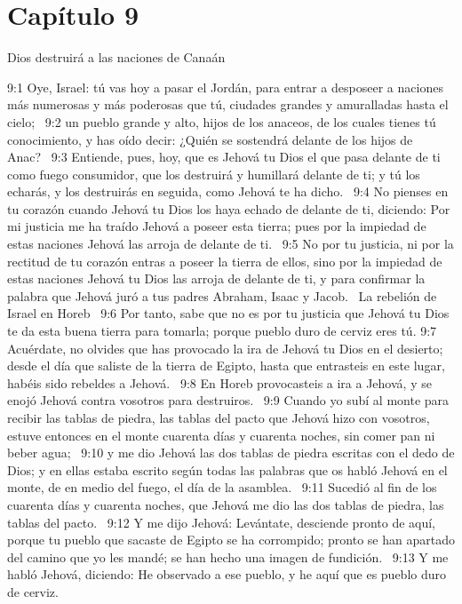 \section*{Capítulo 9}
Dios destruirá a las naciones de Canaán  

9:1 Oye, Israel: tú vas hoy a pasar el Jordán, para entrar a desposeer a naciones más numerosas y más poderosas que tú, ciudades grandes y amuralladas hasta el cielo;  
9:2 un pueblo grande y alto, hijos de los anaceos, de los cuales tienes tú conocimiento, y has oído decir: ¿Quién se sostendrá delante de los hijos de Anac?  
9:3 Entiende, pues, hoy, que es Jehová tu Dios el que pasa delante de ti como fuego consumidor, que los destruirá y humillará delante de ti; y tú los echarás, y los destruirás en seguida, como Jehová te ha dicho.  
9:4 No pienses en tu corazón cuando Jehová tu Dios los haya echado de delante de ti, diciendo: Por mi justicia me ha traído Jehová a poseer esta tierra; pues por la impiedad de estas naciones Jehová las arroja de delante de ti.  
9:5 No por tu justicia, ni por la rectitud de tu corazón entras a poseer la tierra de ellos, sino por la impiedad de estas naciones Jehová tu Dios las arroja de delante de ti, y para confirmar la palabra que Jehová juró a tus padres Abraham, Isaac y Jacob.  
La rebelión de Israel en Horeb   
9:6 Por tanto, sabe que no es por tu justicia que Jehová tu Dios te da esta buena tierra para tomarla; porque pueblo duro de cerviz eres tú. 
9:7 Acuérdate, no olvides que has provocado la ira de Jehová tu Dios en el desierto; desde el día que saliste de la tierra de Egipto, hasta que entrasteis en este lugar, habéis sido rebeldes a Jehová.  
9:8 En Horeb provocasteis a ira a Jehová, y se enojó Jehová contra vosotros para destruiros.  
9:9 Cuando yo subí al monte para recibir las tablas de piedra, las tablas del pacto que Jehová hizo con vosotros, estuve entonces en el monte cuarenta días y cuarenta noches, sin comer pan ni beber agua;  
9:10 y me dio Jehová las dos tablas de piedra escritas con el dedo de Dios; y en ellas estaba escrito según todas las palabras que os habló Jehová en el monte, de en medio del fuego, el día de la asamblea.  
9:11 Sucedió al fin de los cuarenta días y cuarenta noches, que Jehová me dio las dos tablas de piedra, las tablas del pacto.  
9:12 Y me dijo Jehová: Levántate, desciende pronto de aquí, porque tu pueblo que sacaste de Egipto se ha corrompido; pronto se han apartado del camino que yo les mandé; se han hecho una imagen de fundición.  
9:13 Y me habló Jehová, diciendo: He observado a ese pueblo, y he aquí que es pueblo duro de cerviz.  
